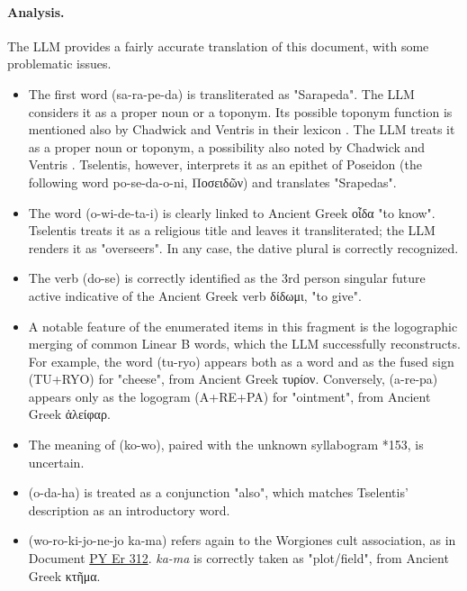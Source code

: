 \paragraph{Analysis.}
The LLM provides a fairly accurate translation of this document, with some problematic issues.
\begin{itemize}
  \item The first word \textlinb{\Bsa\Bra\Be\Bpe\Bda} (sa-ra-pe-da) is transliterated as "Sarapeda". The LLM considers it as a proper noun or a toponym. Its possible toponym function is mentioned also by Chadwick and Ventris in their lexicon \cite{chadwick-notes}.
  The LLM treats it as a proper noun or toponym, a possibility also noted by Chadwick and Ventris \cite{chadwick-notes}. Tselentis, however, interprets it as an epithet of Poseidon (the following word \textlinb{\Bpo\Bse\Bda\Bo\Bni} po-se-da-o-ni, \textgreek{Ποσειδῶν}) and translates "Srapedas".
  \item The word \textlinb{\Bo\Bwi\Bde\Bta\Bi} (o-wi-de-ta-i) is clearly linked to Ancient Greek \textgreek{οἶδα} "to know".
  Tselentis treats it as a religious title and leaves it transliterated; the LLM renders it as "overseers". In any case, the dative plural is correctly recognized.
  \item The verb \textlinb{\Bdo\Bse} (do-se) is correctly identified as the 3rd person singular future active indicative of the Ancient Greek verb \textgreek{δίδωμι}, "to give".
  \item A notable feature of the enumerated items in this fragment is the logographic merging of common Linear B words, which the LLM successfully reconstructs.
  For example, the word \textlinb{\Btu\Broii} (tu-ryo) appears both as a word and as the fused sign (TU+RYO) for "cheese", from Ancient Greek \textgreek{τυρίον}. 
  Conversely, \textlinb{\Ba\Bre\Bpa} (a-re-pa) appears only as the logogram (A+RE+PA) for "ointment", from Ancient Greek \textgreek{ἀλείφαρ}.
  \item The meaning of \textlinb{\Bko\Bwo} (ko-wo), paired with the unknown syllabogram *153, is uncertain.
  \item \textlinb{\Bo\Bda\Baii} (o-da-ha) is treated as a conjunction "also", which matches Tselentis' description as an introductory word.
  \item \textlinb{\Bwo\Bro\Bki\Bjo\Bne\Bjo} \textlinb{\Bka\Bma} (wo-ro-ki-jo-ne-jo ka-ma) refers again to the Worgiones cult association, as in Document \hyperref[doc:pyer312]{PY Er 312}.
  \textit{ka-ma} is correctly taken as "plot/field", from Ancient Greek \textgreek{κτῆμα}.
\end{itemize}

